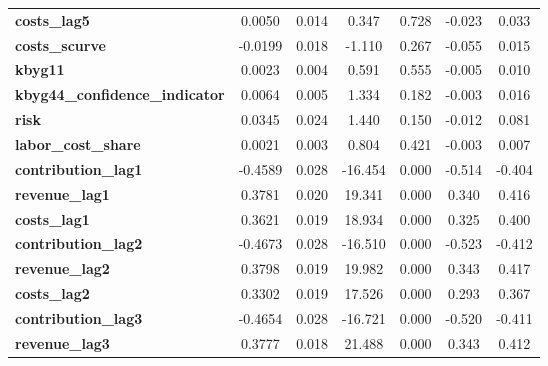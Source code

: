 \begin{center}
\begin{tabular}{lcccccc}
\textbf{costs\_lag5}                        &       0.0050  &        0.014     &     0.347  &         0.728        &       -0.023    &        0.033     \\
\textbf{costs\_scurve}                      &      -0.0199  &        0.018     &    -1.110  &         0.267        &       -0.055    &        0.015     \\
\textbf{kbyg11}                             &       0.0023  &        0.004     &     0.591  &         0.555        &       -0.005    &        0.010     \\
\textbf{kbyg44\_confidence\_indicator}      &       0.0064  &        0.005     &     1.334  &         0.182        &       -0.003    &        0.016     \\
\textbf{risk}                               &       0.0345  &        0.024     &     1.440  &         0.150        &       -0.012    &        0.081     \\
\textbf{labor\_cost\_share}                 &       0.0021  &        0.003     &     0.804  &         0.421        &       -0.003    &        0.007     \\
\textbf{contribution\_lag1}                 &      -0.4589  &        0.028     &   -16.454  &         0.000        &       -0.514    &       -0.404     \\
\textbf{revenue\_lag1}                      &       0.3781  &        0.020     &    19.341  &         0.000        &        0.340    &        0.416     \\
\textbf{costs\_lag1}                        &       0.3621  &        0.019     &    18.934  &         0.000        &        0.325    &        0.400     \\
\textbf{contribution\_lag2}                 &      -0.4673  &        0.028     &   -16.510  &         0.000        &       -0.523    &       -0.412     \\
\textbf{revenue\_lag2}                      &       0.3798  &        0.019     &    19.982  &         0.000        &        0.343    &        0.417     \\
\textbf{costs\_lag2}                        &       0.3302  &        0.019     &    17.526  &         0.000        &        0.293    &        0.367     \\
\textbf{contribution\_lag3}                 &      -0.4654  &        0.028     &   -16.721  &         0.000        &       -0.520    &       -0.411     \\
\textbf{revenue\_lag3}                      &       0.3777  &        0.018     &    21.488  &         0.000        &        0.343    &        0.412     \\

\end{tabular}
\end{center}
